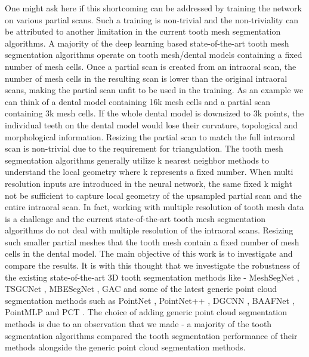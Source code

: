 \documentclass[letterpaper, 10 pt, conference]{ieeeconf}  %
\begin{document}
One might ask here if this shortcoming can be addressed by training the network on various partial scans. Such a training is non-trivial and the non-triviality can be attributed to another limitation in the current tooth mesh segmentation algorithms. A majority of the deep learning based  state-of-the-art tooth mesh segmentation algorithms operate on tooth mesh/dental models containing a fixed number of mesh cells. Once a partial scan is created from an intraoral scan, the number of mesh cells in the resulting scan is lower than the original intraoral scans,  %
making the partial scan unfit to be used in the training. As an example we can think of a dental model containing 16k mesh cells and a partial scan containing 3k mesh cells. If the whole dental model is downsized to 3k points, the individual teeth on the dental model would lose their curvature, topological and morphological information. Resizing the partial scan to match the full intraoral scan is non-trivial due to the requirement for triangulation. The tooth mesh segmentation algorithms generally utilize k nearest neighbor methods to understand the local geometry where k represents a fixed number. When multi resolution inputs are introduced in the neural network, the same fixed k might not be sufficient to capture local geometry of the upsampled partial scan and the entire intraoral scan. In fact, working with multiple resolution of tooth mesh data is a challenge and the current state-of-the-art tooth mesh segmentation algorithms do not deal with multiple resolution of the intraoral scans.
Resizing such smaller partial meshes   that the tooth mesh contain a fixed number of mesh cells in the dental model. The main objective of this work is to investigate and compare the results. It is with this thought that we investigate the robustness of the existing state-of-the-art 3D tooth segmentation methods like - MeshSegNet \cite{lian2020deep}, TSGCNet \cite{zhang2021tsgcnet}, MBESegNet \cite{li2022multi}, GAC \cite{zhao20213d} and some of the latest generic point cloud segmentation methods such as PointNet \cite{qi2017pointnet}, PointNet++ \cite{qi2017pointnet++}, DGCNN \cite{wang2019dynamic}, BAAFNet  \cite{qiu2021semantic}, PointMLP \cite{ma2022rethinking} and  PCT \cite{guo2021pct}.  The choice of adding generic point cloud segmentation methods is due to an observation that we made - a majority of the tooth segmentation algorithms compared the tooth segmentation performance of their methods alongside the generic point cloud segmentation methods. %
\end{document}
